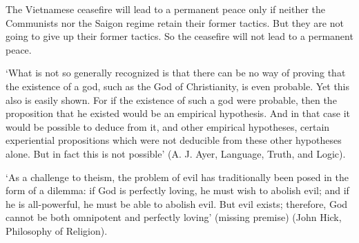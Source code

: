 \begin{enumerate}
\begin{statement} {The Vietnamese ceasefire will lead to a permanent peace only
    if neither the Communists nor the Saigon regime retain their former tactics.
    But they are not going to give up their former tactics. So the ceasefire
    will not lead to a permanent peace.}
\end{statement}


\begin{statement}{ ‘What is not so generally recognized is that there can be no
    way of proving that the existence of a god, such as the God of Christianity,
    is even probable. Yet this also is easily shown. For if the existence of
    such a god were probable, then the proposition that he existed would be an
    empirical hypothesis. And in that case it would be possible to deduce from
    it, and other empirical hypotheses, certain experiential propositions which
    were not deducible from these other hypotheses alone. But in fact this is
    not possible' (A. J. Ayer, Language, Truth, and Logic).}

\end{statement}

\begin{statement}{‘As a challenge to theism, the problem of evil has
    traditionally been posed in the form of a dilemma: if God is perfectly
    loving, he must wish to abolish evil; and if he is all-powerful, he must be
    able to abolish evil. But evil exists; therefore, God cannot be both
    omnipotent and perfectly loving' (missing premise) (John Hick, Philosophy of
    Religion).}
\end{statement}


\end{enumerate}
